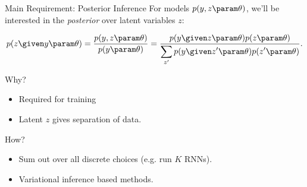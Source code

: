 




\begin{frame}{Main Requirement: Posterior Inference}
    For models $p(y, z \param \theta)$, we'll be interested in the \textit{posterior} over latent variables $z$:

    \begin{align*}
        p(z \given y \param \theta) = \frac{\displaystyle p(y, z \param \theta)}{\displaystyle p(y \param \theta)} = \frac{\displaystyle p(y\given z \param  \theta) p(z \param  \theta)}{\displaystyle \sum_{z'} p(y \given z'\param  \theta) p(z'\param  \theta) }.
    \end{align*}

    \air

    \pause
    Why?
    \begin{itemize}
      \item Required for training
      \item Latent $z$ gives separation of data.

    \end{itemize}

    How?

    \begin{itemize}
    \item Sum out over all discrete choices (e.g. run $K$ RNNs).
    \item Variational inference based methods.
    \end{itemize}

\end{frame}


